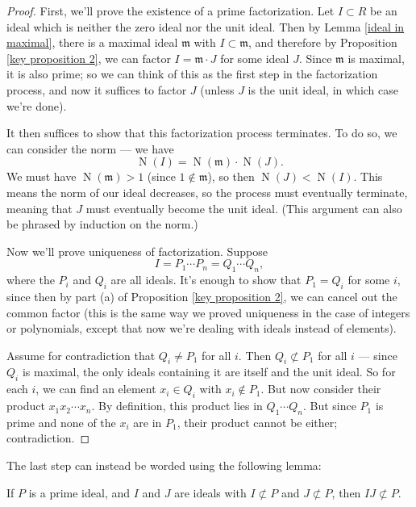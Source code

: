 \begin{proof}
    First, we'll prove the existence of a prime factorization. Let $I \subset R$ be an ideal which is neither the zero ideal nor the unit ideal. Then by Lemma \ref{ideal in maximal}, there is a maximal ideal $\mathfrak{m}$ with $I \subset \mathfrak{m}$, and therefore by Proposition \ref{key proposition 2}, we can factor $I = \mathfrak{m}\cdot J$ for some ideal $J$. Since $\mathfrak{m}$ is maximal, it is also prime; so we can think of this as the first step in the factorization process, and now it suffices to factor $J$ (unless $J$ is the unit ideal, in which case we're done). 
    
    It then suffices to show that this factorization process terminates. To do so, we can consider the norm --- we have \[\operatorname{N}(I) = \operatorname{N}(\mathfrak{m})\cdot \operatorname{N}(J).\] We must have $\operatorname{N}(\mathfrak{m}) > 1$ (since $1 \not\in \mathfrak{m}$), so then $\operatorname{N}(J) < \operatorname{N}(I)$. This means the norm of our ideal decreases, so the process must eventually terminate, meaning that $J$ must eventually become the unit ideal. (This argument can also be phrased by induction on the norm.)
    
    Now we'll prove uniqueness of factorization. Suppose \[I = P_1\cdots P_n = Q_1\cdots Q_n,\] where the $P_i$ and $Q_i$ are all ideals. It's enough to show that $P_1 = Q_i$ for some $i$, since then by part (a) of Proposition \ref{key proposition 2}, we can cancel out the common factor (this is the same way we proved uniqueness in the case of integers or polynomials, except that now we're dealing with ideals instead of elements). 
    
    Assume for contradiction that $Q_i \neq P_1$ for all $i$. Then $Q_i \not\subset P_1$ for all $i$ --- since $Q_i$ is maximal, the only ideals containing it are itself and the unit ideal. So for each $i$, we can find an element $x_i \in Q_i$ with $x_i \not\in P_1$. But now consider their product $x_1x_2\cdots x_n$. By definition, this product lies in $Q_1\cdots Q_n$. But since $P_1$ is prime and none of the $x_i$ are in $P_1$, their product cannot be either; contradiction. 
\end{proof}

The last step can instead be worded using the following lemma: 

\begin{lemma}
    If $P$ is a prime ideal, and $I$ and $J$ are ideals with $I \not\subset P$ and $J \not\subset P$, then $IJ \not\subset P$. 
\end{lemma}


